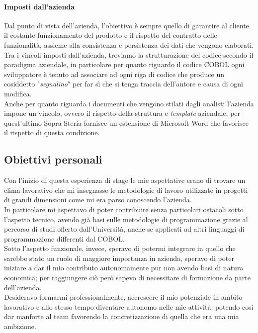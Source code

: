 	\paragraph{Imposti dall'azienda}
	\leavevmode	\newline
	\leavevmode	\newline
	Dal punto di vista dell'azienda, l'obiettivo è sempre quello di garantire al cliente il costante funzionamento del prodotto e il rispetto del contratto delle funzionalità, assieme alla consistenza e persistenza dei dati che vengono elaborati.\\
	
	Tra i vincoli imposti dall'azienda, troviamo la strutturazione del codice secondo il paradigma aziendale, in particolare per quanto riguardo il codice COBOL ogni sviluppatore è tenuto ad associare ad ogni riga di codice che produce un cosiddetto "\textit{segnalino}" per far sì che si tenga traccia dell'autore e causa di ogni modifica.\\
	
	Anche per quanto riguarda i documenti che vengono stilati dagli analisti l'azienda impone un vincolo, ovvero il rispetto della struttura e \textit{template} aziendale, per quest'ultimo Sopra Steria fornisce un estensione di Microsoft Word che favorisce il rispetto di questa condizione.

\subsection{Obiettivi personali}
	Con l'inizio di questa esperienza di stage le mie aspettative erano di trovare un clima lavorativo che mi insegnasse le metodologie di lavoro utilizzate in progetti di grandi dimensioni come mi era parso conoscendo l'azienda.\\

	In particolare mi aspettavo di poter contribuire senza particolari ostacoli sotto l'aspetto tecnico, avendo già basi sulle metodologie di programmazione grazie al percorso di studi offerto dall'Università, anche se applicati ad altri linguaggi di programmazione differenti dal COBOL.\\
	
	Sotto l'aspetto funzionale, invece, speravo di potermi integrare in quello che sarebbe stato un ruolo di maggiore importanza in azienda, speravo di poter iniziare a dar il mio contributo autonomamente pur non avendo basi di natura economica; per raggiungere ciò però sapevo di necessitare di formazione da parte dell'azienda.\\
	
	Desideravo formarmi professionalmente, accrescere il mio potenziale in ambito lavorativo e allo stesso tempo diventare autonomo nelle mie attività; potendo così dar manforte al team favorendo la concretizzazione di quella che era una mia ambizione.